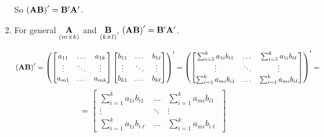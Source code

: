 \begin{enumerate}[font=\bfseries]
\begin{enumerate}
            So ${\left(\bold{AB}\right)}^\prime = \bold{B}^\prime \bold{A}^\prime$.

            \item For general $\underset{\left(m\times k\right)}{\bold{A}}$ and $\underset{\left(k\times l\right)}{\bold{B}}$, ${\left(\bold{AB}\right)}^\prime = \bold{B}^\prime\bold{A}^\prime$.
            
            \[
                {\left(\bold{AB}\right)}^\prime =
                {\left(
                \begin{bmatrix}
                    a_{11} & \dots & a_{1k} \\
                    \vdots & \ddots & \vdots \\
                    a_{m1} & \dots & a_{mk}
                \end{bmatrix}
                \begin{bmatrix}
                    b_{11} & \dots & b_{1\ell} \\
                    \vdots & \ddots & \vdots \\
                    b_{k1} & \dots & b_{k\ell}
                \end{bmatrix}
                \right)}^\prime = 
                {\left(
                \begin{bmatrix}
                    \sum_{i=1}^k{a_{1i}b_{i1}} & \dots & \sum_{i=1}^k{a_{1i}b_{i\ell}} \\
                    \vdots & \ddots & \vdots \\
                    \sum_{i=1}^k{a_{mi}b_{i1}} & \dots & \sum_{i=1}^k{a_{mi}b_{i\ell}}
                \end{bmatrix}
                \right)}^\prime = 
            \]
            \[
                = \begin{bmatrix}
                    \sum_{i=1}^k{a_{1i}b_{i1}} & \dots & \sum_{i=1}^k{a_{mi}b_{i1}} \\
                    \vdots & \ddots & \vdots \\
                    \sum_{i=1}^k{a_{1i}b_{i\ell}} & \dots & \sum_{i=1}^k{a_{mi}b_{i\ell}}
                \end{bmatrix}
            \]


\end{enumerate}
\end{enumerate}

